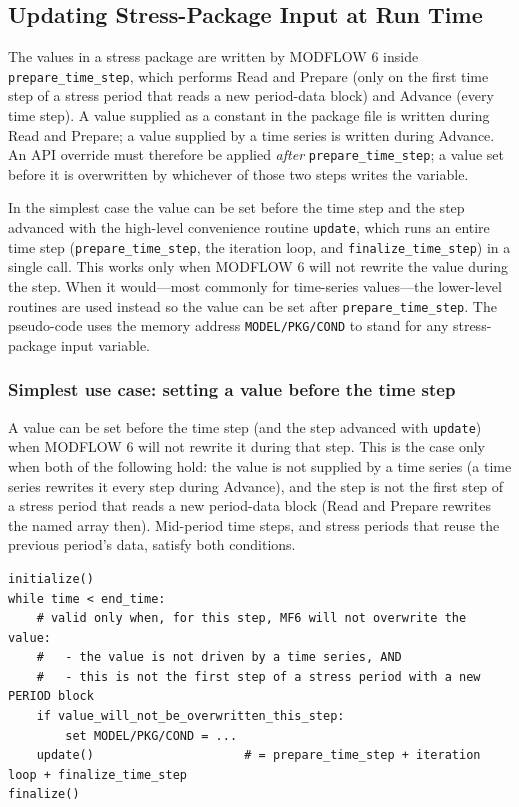 \subsection{Updating Stress-Package Input at Run Time}

The values in a stress package are written by MODFLOW 6 inside
\texttt{prepare\_time\_step}, which performs Read and Prepare (only on the first
time step of a stress period that reads a new period-data block) and Advance
(every time step). A value supplied as a constant in the package file is written
during Read and Prepare; a value supplied by a time series is written during
Advance. An API override must therefore be applied \emph{after}
\texttt{prepare\_time\_step}; a value set before it is overwritten by whichever
of those two steps writes the variable.

In the simplest case the value can be set before the time step and the step
advanced with the high-level convenience routine \texttt{update}, which runs an
entire time step (\texttt{prepare\_time\_step}, the iteration loop, and
\texttt{finalize\_time\_step}) in a single call. This works only when MODFLOW 6
will not rewrite the value during the step. When it would---most commonly for
time-series values---the lower-level routines are used instead so the value can
be set after \texttt{prepare\_time\_step}. The pseudo-code uses the memory
address \texttt{MODEL/PKG/COND} to stand for any stress-package input variable.

\subsubsection{Simplest use case: setting a value before the time step}

A value can be set before the time step (and the step advanced with
\texttt{update}) when MODFLOW 6 will not rewrite it during that step. This is the
case only when both of the following hold: the value is not supplied by a time
series (a time series rewrites it every step during Advance), and the step is not
the first step of a stress period that reads a new period-data block (Read and
Prepare rewrites the named array then). Mid-period time steps, and stress periods
that reuse the previous period's data, satisfy both conditions.

\begin{lstlisting}[style=pseudocode]
initialize()
while time < end_time:
    # valid only when, for this step, MF6 will not overwrite the value:
    #   - the value is not driven by a time series, AND
    #   - this is not the first step of a stress period with a new PERIOD block
    if value_will_not_be_overwritten_this_step:
        set MODEL/PKG/COND = ...
    update()                     # = prepare_time_step + iteration loop + finalize_time_step
finalize()
\end{lstlisting}

